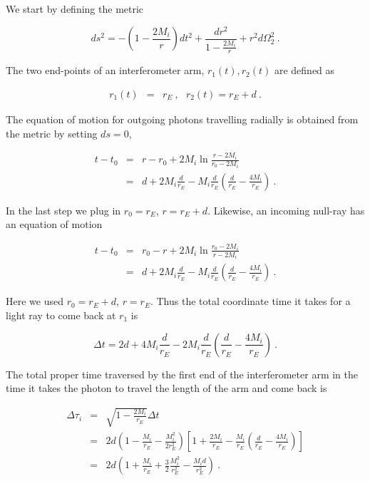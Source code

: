 \documentclass[aps,showpacs,twocolumn,floats,prd,superscriptaddress,nofootinbib]{revtex4-1}
\begin{document}
We start by defining the metric

\begin{equation}
ds^2 = -\left(1-\frac{2M_i}{r}\right)dt^2 + \frac{dr^2}{1-\frac{2M_i}{r}}+r^2d\Omega_2^2~.
\end{equation}

The two end-points of an interferometer arm, $r_1(t), r_2(t)$ are defined as

\begin{eqnarray}
r_1(t) &=& r_{E}~, \ \ \ r_2(t) = r_{E}+d~.
\end{eqnarray}

The equation of motion for outgoing photons travelling radially is obtained from the metric by setting $ds=0$,

\begin{eqnarray}
t-t_0 &=& r-r_0 + 2M_i\ln\frac{r-2M_i}{r_0-2M_i} \\ \nonumber
&=& d + 2M_i\frac{d}{r_E} -M_i\frac{d}{r_E}
\left( \frac{d}{r_E}-\frac{4M_i}{r_E} \right)~.
\label{eq-dt1}
\end{eqnarray}

In the last step we plug in $r_0=r_E$, $r = r_E+d$. Likewise, an incoming null-ray has an equation of motion

\begin{eqnarray}
t-t_0 &=& r_0-r + 2M_i\ln\frac{r_0-2M_i}{r-2M_i} \\ \nonumber
&=& d + 2M_i\frac{d}{r_E} - M_i\frac{d}{r_E}
\left( \frac{d}{r_E}-\frac{4M_i}{r_E} \right) ~.
\end{eqnarray}

Here we used $r_0 = r_E+d$, $r = r_E$. Thus the total coordinate time it takes for a light ray to come back at $r_1$ is

\begin{equation}
\Delta t = 2d + 4M_i\frac{d}{r_E} - 2M_i\frac{d}{r_E}
\left( \frac{d}{r_E}-\frac{4M_i}{r_E} \right)~.
\end{equation}

The total proper time traversed by the first end of the interferometer arm in the time it takes the photon to travel the length of the arm and come back is 

\begin{eqnarray}
\Delta \tau_i &=& \sqrt{1-\frac{2M_i}{r_E}}\Delta t  \\ \nonumber
&=& 2d \left(1-\frac{M_i}{r_E} - \frac{M_i^2}{2r_E^2}\right) 
\left[ 1+\frac{2M_i}{r_E} - \frac{M_i}{r_E}\left( \frac{d}{r_E} - \frac{4M_i}{r_E} \right) \right] \\ \nonumber
&=& 2d
\left(1 + \frac{M_i}{r_E} + \frac{3}{2}\frac{M_i^2}{r_E^2} - \frac{M_id}{r_E^2}\right)~.
\end{eqnarray}
\end{document}
